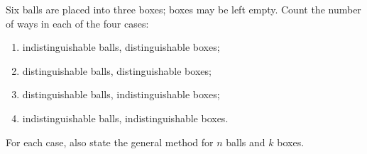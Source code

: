 Six balls are placed into three boxes; boxes may be left empty. Count the number of ways in each of the four cases:
\begin{enumerate}
\item[(a)] indistinguishable balls, distinguishable boxes;
\item[(b)] distinguishable balls, distinguishable boxes;
\item[(c)] distinguishable balls, indistinguishable boxes;
\item[(d)] indistinguishable balls, indistinguishable boxes.
\end{enumerate}
For each case, also state the general method for $n$ balls and $k$ boxes.
